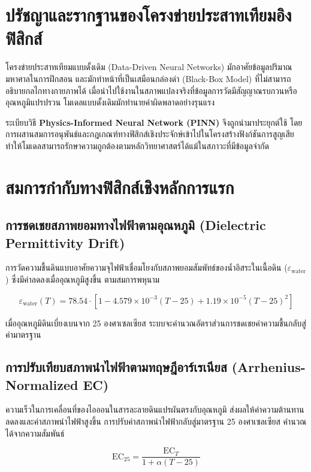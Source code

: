 \section{ปรัชญาและรากฐานของโครงข่ายประสาทเทียมอิงฟิสิกส์}

โครงข่ายประสาทเทียมแบบดั้งเดิม (Data-Driven Neural Networks) มักอาศัยข้อมูลปริมาณมหาศาลในการฝึกสอน และมักทำหน้าที่เป็นเสมือนกล่องดำ (Black-Box Model) ที่ไม่สามารถอธิบายกลไกทางกายภาพได้ เมื่อนำไปใช้งานในสภาพแปลงจริงที่ข้อมูลการวัดมีสัญญาณรบกวนหรืออุณหภูมิแปรปรวน โมเดลแบบดั้งเดิมมักทำนายค่าผิดพลาดอย่างรุนแรง

ระเบียบวิธี \textbf{Physics-Informed Neural Network (PINN)} จึงถูกนำมาประยุกต์ใช้ โดยการผสานสมการอนุพันธ์และกฎเกณฑ์ทางฟิสิกส์เชิงประจักษ์เข้าไปในโครงสร้างฟังก์ชันการสูญเสีย ทำให้โมเดลสามารถรักษาความถูกต้องตามหลักวิทยาศาสตร์ได้แม้ในสภาวะที่มีข้อมูลจำกัด

\section{สมการกำกับทางฟิสิกส์เชิงหลักการแรก}

\subsection{การชดเชยสภาพยอมทางไฟฟ้าตามอุณหภูมิ (Dielectric Permittivity Drift)}
การวัดความชื้นดินแบบอาศัยความจุไฟฟ้าเชื่อมโยงกับสภาพยอมสัมพัทธ์ของน้ำอิสระในเนื้อดิน ($\varepsilon_{\text{water}}$) ซึ่งมีค่าลดลงเมื่ออุณหภูมิสูงขึ้น ตามสมการพหุนาม

\begin{equation}
\varepsilon_{\text{water}}(T) = 78.54 \cdot \left[1 - 4.579 \times 10^{-3}(T - 25) + 1.19 \times 10^{-5}(T - 25)^2\right]
\end{equation}

เมื่ออุณหภูมิดินเบี่ยงเบนจาก 25 องศาเซลเซียส ระบบจะคำนวณอัตราส่วนการชดเชยค่าความชื้นกลับสู่ค่ามาตรฐาน

\subsection{การปรับเทียบสภาพนำไฟฟ้าตามทฤษฎีอาร์เรเนียส (Arrhenius-Normalized EC)}
ความเร็วในการเคลื่อนที่ของไอออนในสารละลายดินแปรผันตรงกับอุณหภูมิ ส่งผลให้ค่าความต้านทานลดลงและค่าสภาพนำไฟฟ้าสูงขึ้น การปรับค่าสภาพนำไฟฟ้ากลับสู่มาตรฐาน 25 องศาเซลเซียส คำนวณได้จากความสัมพันธ์

\begin{equation}
\text{EC}_{25} = \frac{\text{EC}_T}{1 + \alpha (T - 25)}
\end{equation}

